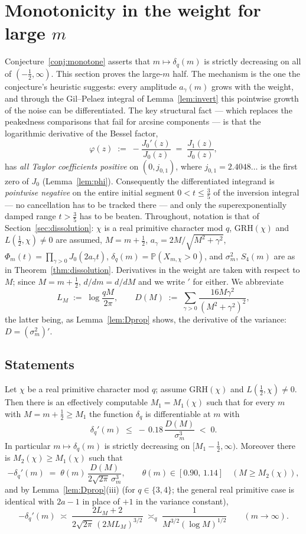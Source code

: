 \section{Monotonicity in the weight for large $m$}
\label{sec:monotone-large}

Conjecture~\ref{conj:monotone} asserts that $m\mapsto\delta_q(m)$ is
strictly decreasing on all of $(-\tfrac12,\infty)$. This section proves
the large-$m$ half. The mechanism is the one the conjecture's
heuristic suggests: every amplitude $a_\gamma(m)$ grows with the
weight, and through the Gil--Pelaez integral of
Lemma~\ref{lem:invert} this pointwise growth of the noise can be
differentiated. The key structural fact --- which replaces the
peakedness comparisons that fail for arcsine components --- is that
the logarithmic derivative of the Bessel factor,
\[
\varphi(z)\;:=\;-\frac{J_0'(z)}{J_0(z)}\;=\;\frac{J_1(z)}{J_0(z)},
\]
has \emph{all Taylor coefficients positive} on $(0,j_{0,1})$, where
$j_{0,1}=2.4048\ldots$ is the first zero of $J_0$
(Lemma~\ref{lem:phi}). Consequently the differentiated integrand is
\emph{pointwise negative} on the entire initial segment
$0<t\le\tfrac35$ of the inversion integral --- no cancellation has to
be tracked there --- and only the superexponentially damped range
$t>\tfrac35$ has to be beaten. Throughout, notation is that of
Section~\ref{sec:dissolution}: $\chi$ is a real primitive character
mod $q$, GRH$(\chi)$ and $L(\tfrac12,\chi)\ne0$ are assumed,
$M=m+\tfrac12$, $a_\gamma=2M/\sqrt{M^2+\gamma^2}$,
$\Phi_m(t)=\prod_{\gamma>0}J_0(2a_\gamma t)$,
$\delta_q(m)=\mathbb P(X_{m,\chi}>0)$, and $\sigma_m^2$, $S_4(m)$ are
as in Theorem~\ref{thm:dissolution}. Derivatives in the weight are
taken with respect to $M$; since $M=m+\tfrac12$, $d/dm=d/dM$ and we
write $'$ for either. We abbreviate
\[
L_M\;:=\;\log\frac{qM}{2\pi},
\qquad
D(M)\;:=\;\sum_{\gamma>0}\frac{16M\gamma^2}{(M^2+\gamma^2)^2},
\]
the latter being, as Lemma~\ref{lem:Dprop} shows, the derivative of
the variance: $D=(\sigma_m^2)'$.

\subsection*{Statements}

\begin{theorem}\label{thm:monotone-large}
Let $\chi$ be a real primitive character mod $q$; assume GRH$(\chi)$
and $L(\tfrac12,\chi)\ne0$. Then there is an effectively computable
$M_1=M_1(\chi)$ such that for every $m$ with $M=m+\tfrac12\ge M_1$ the
function $\delta_q$ is differentiable at $m$ with
\[
\delta_q'(m)\;\le\;-\,0.18\,\frac{D(M)}{\sigma_m^{3}}\;<\;0 .
\]
In particular $m\mapsto\delta_q(m)$ is strictly decreasing on
$[M_1-\tfrac12,\infty)$. Moreover there is $M_2(\chi)\ge M_1(\chi)$
such that
\[
-\delta_q'(m)\;=\;\theta(m)\,\frac{D(M)}{2\sqrt{2\pi}\,\sigma_m^{3}},
\qquad \theta(m)\in[0.90,\,1.14]\quad(M\ge M_2(\chi)),
\]
and by Lemma~\ref{lem:Dprop}(iii) (for $q\in\{3,4\}$; the general
real primitive case is identical with $2a-1$ in place of $+1$ in the
variance constant),
\[
-\delta_q'(m)\;\asymp\;\frac{2L_M+2}{2\sqrt{2\pi}\,(2ML_M)^{3/2}}
\;\asymp_q\;\frac{1}{M^{3/2}(\log M)^{1/2}}
\qquad(m\to\infty).
\]
\end{theorem}

